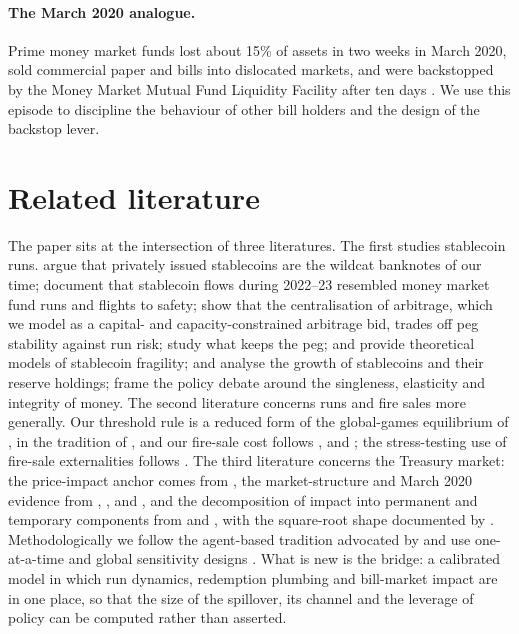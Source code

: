 \paragraph{The March 2020 analogue.} Prime money market funds lost about 15\% of assets in two weeks in March
2020, sold commercial paper and bills into dislocated markets, and were backstopped by the Money Market Mutual Fund
Liquidity Facility after ten days \citep{li2021,fed_mmlf2020}. We use this episode to discipline the behaviour of
other bill holders and the design of the backstop lever.

\section{Related literature}\label{sec:lit}

The paper sits at the intersection of three literatures. The first studies stablecoin runs. \citet{gorton2023}
argue that privately issued stablecoins are the wildcat banknotes of our time; \citet{anadu2023} document that
stablecoin flows during 2022--23 resembled money market fund runs and flights to safety; \citet{ma2023} show that
the centralisation of arbitrage, which we model as a capital- and capacity-constrained arbitrage bid, trades off
peg stability against run risk; \citet{lyons2023} study what keeps the peg; \citet{davernas2022} and
\citet{bertsch2023} provide theoretical models of stablecoin fragility; \citet{liao2022} and \citet{barthelemy2023}
analyse the growth of stablecoins and their reserve holdings; \citet{bis2025} frame the policy debate around the
singleness, elasticity and integrity of money. The second literature concerns runs and fire sales more generally.
Our threshold rule is a reduced form of the global-games equilibrium of \citet{goldstein2005}, in the tradition of
\citet{diamond1983}, and our fire-sale cost follows \citet{morris2016}, \citet{shleifer2011} and
\citet{greenwood2015}; the stress-testing use of fire-sale externalities follows \citet{cont2017}. The third
literature concerns the Treasury market: the price-impact anchor comes from \citet{ahmed2025}, the market-structure
and March 2020 evidence from \citet{duffie2020}, \citet{vissing2021}, \citet{he2022} and \citet{fleming2003}, and the
decomposition of impact into permanent and temporary components from \citet{kyle1985} and \citet{almgren2001}, with
the square-root shape documented by \citet{bouchaud2018}. Methodologically we follow the agent-based tradition
advocated by \citet{farmer2009} and use one-at-a-time and global sensitivity designs \citep{saltelli2008,morris1991}.
What is new is the bridge: a calibrated model in which run dynamics, redemption plumbing and bill-market impact are
in one place, so that the size of the spillover, its channel and the leverage of policy can be computed rather than
asserted.

